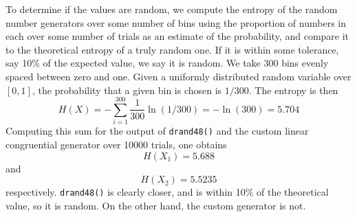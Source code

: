 \documentclass{article}
\begin{document}
To determine if the values are random, we compute the entropy of the random number generators over some number of bins using the proportion of numbers in each over some number of trials as an estimate of the probability, and compare it to the theoretical entropy of a truly random one. If it is within some tolerance, say 10\% of the expected value, we say it is random.
We take 300 bins evenly spaced between zero and one. Given a uniformly distributed random variable over $[0,1]$, the probability that a given bin is chosen is $1/300$. The entropy is then
\[H(X)=-\sum_{i=1}^{300}\frac{1}{300}\ln(1/300)=-\ln(300)=5.704\]
Computing this sum for the output of \verb|drand48()| and the custom linear congruential generator over 10000 trials, one obtains
\[H(X_1)=5.688\]
and
\[H(X_2)=5.5235\]
respectively. \verb|drand48()| is clearly closer, and is within 10\% of the theoretical value, so it is random. On the other hand, the custom generator is not.
\end{document}
